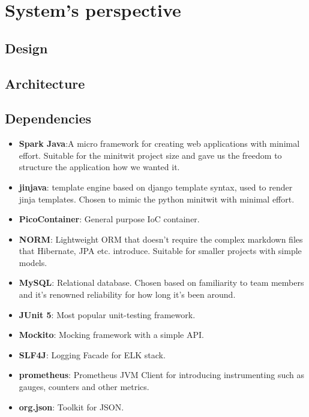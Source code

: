 \section{System's perspective} \label{section:System perspective}
\subsection{Design} %

\subsection{Architecture} %

\subsection{Dependencies } %
\begin{itemize}
    \item \textbf{Spark Java}:A micro framework for creating web applications with minimal effort. Suitable for the minitwit project size and gave us the freedom to structure the application how we wanted it.
    \item \textbf{jinjava}: template engine based on django template syntax, used to render jinja templates. Chosen to mimic the python minitwit with minimal effort. 
    \item \textbf{PicoContainer}: General purpose IoC container.
    \item \textbf{NORM}: Lightweight ORM that doesn't require the complex markdown files that Hibernate, JPA etc. introduce. Suitable for smaller projects with simple models. 
    \item \textbf{MySQL}: Relational database. Chosen based on familiarity to team members and it's renowned reliability for how long it's been around.  
    \item \textbf{JUnit 5}: Most popular unit-testing framework.
    \item \textbf{Mockito}: Mocking framework with a simple API.
    \item \textbf{SLF4J}: Logging Facade for ELK stack. 
    \item \textbf{prometheus}: Prometheus JVM Client for introducing instrumenting such as gauges, counters and other metrics.
    \item \textbf{org.json}: Toolkit for JSON.
\end{itemize}


